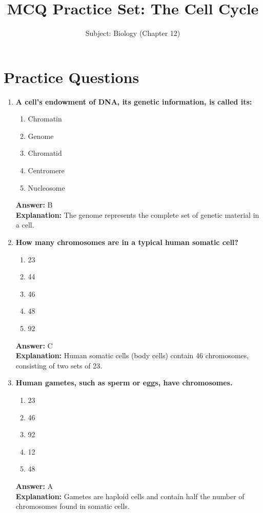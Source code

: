 \documentclass[11pt, a4paper]{article}
\title{MCQ Practice Set: The Cell Cycle}
\author{Subject: Biology (Chapter 12)}
\date{}
\begin{document}
\maketitle

\section*{Practice Questions}

\begin{enumerate}[leftmargin=*, label=\arabic*.]

\item \textbf{A cell's endowment of DNA, its genetic information, is called its:}
\begin{enumerate}[label=\Alph*.]
\item Chromatin
\item Genome
\item Chromatid
\item Centromere
\item Nucleosome
\end{enumerate}
\textbf{Answer:} B \\
\textbf{Explanation:} The genome represents the complete set of genetic material in a cell.

\item \textbf{How many chromosomes are in a typical human somatic cell?}
\begin{enumerate}[label=\Alph*.]
\item 23
\item 44
\item 46
\item 48
\item 92
\end{enumerate}
\textbf{Answer:} C \\
\textbf{Explanation:} Human somatic cells (body cells) contain 46 chromosomes, consisting of two sets of 23.

\item \textbf{Human gametes, such as sperm or eggs, have \underline{\hspace{1cm}} chromosomes.}
\begin{enumerate}[label=\Alph*.]
\item 23
\item 46
\item 92
\item 12
\item 48
\end{enumerate}
\textbf{Answer:} A \\
\textbf{Explanation:} Gametes are haploid cells and contain half the number of chromosomes found in somatic cells.


\end{enumerate}
\end{document}
